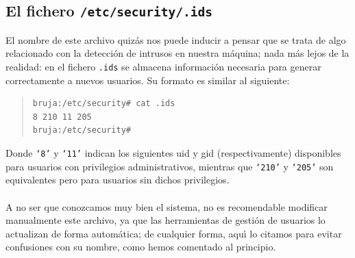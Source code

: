 \subsection{El fichero {\tt /etc/security/.ids}}
El nombre de este archivo quiz\'as nos puede inducir a pensar que se trata de
algo relacionado con la detecci\'on de intrusos en nuestra m\'aquina; nada
m\'as lejos de la realidad: en el fichero {\tt .ids} se almacena informaci\'on
necesaria para generar correctamente a nuevos usuarios. Su formato es similar 
al siguiente:
\begin{quote}
\begin{verbatim}
bruja:/etc/security# cat .ids
8 210 11 205
bruja:/etc/security#
\end{verbatim}
\end{quote}
Donde {\tt `8'} y {\tt `11'} indican los siguientes {\sc uid} y {\sc gid}
(respectivamente) disponibles para usuarios con privilegios administrativos,
mientras que {\tt `210'} y {\tt `205'} son equivalentes pero para usuarios sin
dichos privilegios.\\
\\A no ser que conozcamos muy bien el sistema, no es recomendable modificar 
manualmente este archivo, ya que las herramientas de gesti\'on de usuarios lo 
actualizan de forma autom\'atica; de cualquier forma, aqu\'{\i} lo citamos para 
evitar confusiones con su nombre, como hemos comentado al principio.
